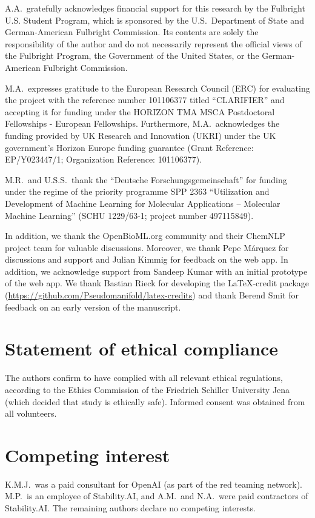 \documentclass[11pt, oneside]{article}
\begin{document}
A.A.\ gratefully acknowledges financial support for this research by the Fulbright U.S. Student Program, which is sponsored by the U.S.\ Department of State and German-American Fulbright Commission. Its contents are solely the responsibility of the author and do not necessarily represent the official views of the Fulbright Program, the Government of the United States, or the German-American Fulbright Commission.

M.A.\ expresses gratitude to the European Research Council (ERC) for evaluating the project with the reference number 101106377 titled \enquote{CLARIFIER} and accepting it for funding under the HORIZON TMA MSCA Postdoctoral Fellowships - European Fellowships.
Furthermore, M.A.\ acknowledges the funding provided by UK Research and Innovation (UKRI) under the UK government’s Horizon Europe funding guarantee (Grant Reference: EP/Y023447/1; Organization Reference: 101106377).

M.R.\ and U.S.S.\ thank the \enquote{Deutsche Forschungsgemeinschaft} for funding under the regime of the priority programme SPP 2363 \enquote{Utilization and Development of Machine Learning for Molecular Applications – Molecular Machine Learning} (SCHU 1229/63-1; project number 497115849).

In addition, we thank the OpenBioML.org community and their ChemNLP project team for valuable discussions.
Moreover, we thank Pepe Márquez for discussions and support and Julian Kimmig for feedback on the web app.
In addition, we acknowledge support from Sandeep Kumar with an initial prototype of the web app.
We thank Bastian Rieck for developing the \LaTeX-credit package (\url{https://github.com/Pseudomanifold/latex-credits}) and thank Berend Smit for feedback on an early version of the manuscript.

\section*{Statement of ethical compliance}
The authors confirm to have complied with all relevant ethical regulations, according to the Ethics Commission of the Friedrich Schiller University Jena (which decided that study is ethically safe). Informed consent was obtained from all volunteers.


\section*{Competing interest}
K.M.J.\ was a paid consultant for OpenAI (as part of the red teaming network). M.P.\ is an employee of Stability.AI, and A.M.\ and N.A.\ were paid contractors of Stability.AI. The remaining authors declare no competing interests.
\end{document}

